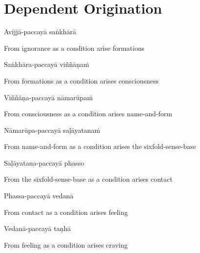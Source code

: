 \suttaRef{[MN 118]}

\clearpage

\section{Dependent Origination}

\begin{leader}
\end{leader}
\begin{leader}
\end{leader}

Avijjā-paccayā saṅkhārā

\begin{cprenglish}
  From ignorance as a condition arise formations
\end{cprenglish}

Saṅkhāra-paccayā viññāṇaṁ

\begin{cprenglish}
  From formations as a condition arises consciousness
\end{cprenglish}

Viññāṇa-paccayā nāmarūpaṁ

\begin{cprenglish}
  From consciousness as a condition arises name-and-form
\end{cprenglish}

Nāmarūpa-paccayā saḷāyatanaṁ

\begin{cprenglish}
  From name-and-form as a condition arises the sixfold-sense-base
\end{cprenglish}

Saḷāyatana-paccayā phasso

\begin{cprenglish}
  From the sixfold-sense-base as a condition arises contact
\end{cprenglish}

Phassa-paccayā vedanā

\begin{cprenglish}
  From contact as a condition arises feeling
\end{cprenglish}

Vedanā-paccayā taṇhā

\begin{cprenglish}
  From feeling as a condition arises craving
\end{cprenglish}

